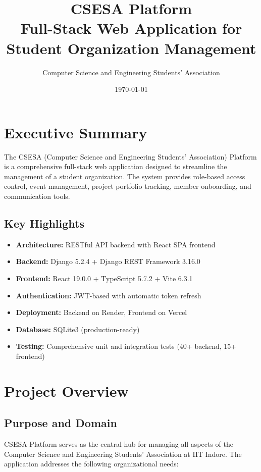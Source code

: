 \documentclass[11pt,a4paper]{article}
\title{\textbf{CSESA Platform} \\ \large Full-Stack Web Application for Student Organization Management}
\author{Computer Science and Engineering Students' Association}
\date{\today}
\begin{document}
\maketitle
\tableofcontents
\newpage

\section{Executive Summary}

The CSESA (Computer Science and Engineering Students' Association) Platform is a comprehensive full-stack web application designed to streamline the management of a student organization. The system provides role-based access control, event management, project portfolio tracking, member onboarding, and communication tools.

\subsection{Key Highlights}
\begin{itemize}[leftmargin=*]
    \item \textbf{Architecture:} RESTful API backend with React SPA frontend
    \item \textbf{Backend:} Django 5.2.4 + Django REST Framework 3.16.0
    \item \textbf{Frontend:} React 19.0.0 + TypeScript 5.7.2 + Vite 6.3.1
    \item \textbf{Authentication:} JWT-based with automatic token refresh
    \item \textbf{Deployment:} Backend on Render, Frontend on Vercel
    \item \textbf{Database:} SQLite3 (production-ready)
    \item \textbf{Testing:} Comprehensive unit and integration tests (40+ backend, 15+ frontend)
\end{itemize}

\section{Project Overview}

\subsection{Purpose and Domain}
CSESA Platform serves as the central hub for managing all aspects of the Computer Science and Engineering Students' Association at IIT Indore. The application addresses the following organizational needs:
\end{document}
